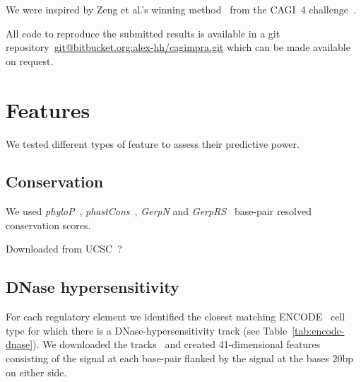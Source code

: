 \documentclass{article}
\begin{document}
We were inspired by Zeng et al.'s winning
method~\cite{ZengAccurateeQTLprioritization2017} from the CAGI~4
challenge~\citep{KreimerPredictinggeneexpression2017}.

All code to reproduce the submitted results is available in a git
repository~\url{git@bitbucket.org:alex-hh/cagimpra.git} which can be made
available on request.


\section*{Features}

We tested different types of feature to assess their predictive power.


\subsection*{Conservation}

We used \emph{phyloP}~\cite{PollardDetectionnonneutralsubstitution2010},
\emph{phastCons}~\cite{SiepelEvolutionarilyconservedelements2005}, \emph{GerpN}
and \emph{GerpRS}~\cite{CooperDistributionintensityconstraint2005a} base-pair
resolved conservation scores.

Downloaded from UCSC~\cite{KuhnUCSCgenomebrowser2013}?


\subsection*{DNase hypersensitivity}

For each regulatory element we identified the closest matching
ENCODE~\cite{DunhamintegratedencyclopediaDNA2012} cell type for which there is
a DNase-hypersensitivity track (see Table~\ref{tab:encode-dnase}). We
downloaded the tracks~\cite{RosenbloomENCODEDataUCSC2012} and created
41-dimensional features consisting of the signal at each base-pair flanked by
the signal at the bases 20bp on either side.
\end{document}
